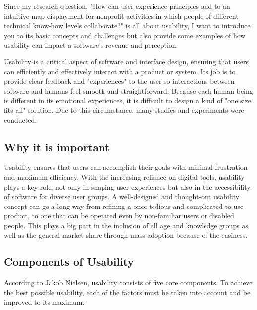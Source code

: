 \Author{\daAuthorTwo}

Since my research question, "How can user-experience principles add to an intuitive map displayment for nonprofit activities in which people of different technical know-how levels collaborate?" is all about usability, I want to introduce you to its basic concepts and challenges but also provide some examples of how usability can impact a software's revenue and perception.

\blankLine

Usability is a critical aspect of software and interface design, ensuring that users can efficiently and effectively interact with a product or system. Its job is to provide clear feedback and "experiences" to the user so interactions between software and humans feel smooth and straightforward. Because each human being is different in its emotional experiences, it is difficult to design a kind of "one size fits all" solution. Due to this circumstance, many studies and experiments were conducted. \autocite{Paul:Usability101}

\subsection{Why it is important}

Usability ensures that users can accomplish their goals with minimal frustration and maximum efficiency. With the increasing reliance on digital tools, usability plays a key role, not only in shaping user experiences but also in the accessibility of software for diverse user groups. A well-designed and thought-out usability concept can go a long way from refining a once tedious and complicated-to-use product, to one that can be operated even by non-familiar users or disabled people. This plays a big part in the inclusion of all age and knowledge groups as well as the general market share through mass adoption because of the easiness.

\pagebreak

\subsection{Components of Usability}

According to Jakob Nielsen, usability consists of five core components. To achieve the best possible usability, each of the factors must be taken into account and be improved to its maximum.

